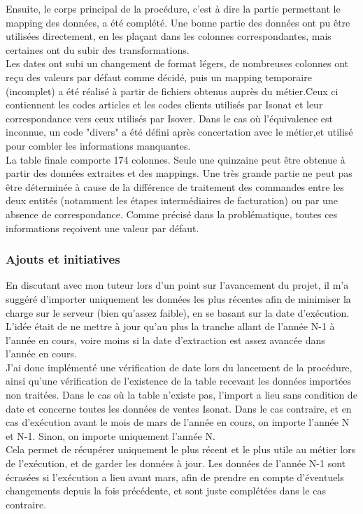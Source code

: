 \documentclass[a4paper,12pt]{article}
\begin{document}
Ensuite, le corps principal de la procédure, c'est à dire la partie permettant le mapping des données, a été complété. Une bonne partie des données ont pu être utilisées directement, en les plaçant dans les colonnes correspondantes, mais certaines ont du subir des transformations.\\
Les dates ont subi un changement de format légers, de nombreuses colonnes ont reçu des valeurs par défaut comme décidé, puis un mapping temporaire (incomplet) a été réalisé à partir de fichiers obtenus auprès du métier.Ceux ci contiennent les codes articles et les codes clients utilisés par Isonat et leur correspondance vers ceux utilisés par Isover. Dans le cas où l'équivalence est inconnue, un code "divers" a été défini après concertation avec le métier,et utilisé pour combler les informations manquantes. \\
La table finale comporte 174 colonnes. Seule une quinzaine peut être obtenue à partir des données extraites et des mappings. Une très grande partie ne peut pas être déterminée à cause de la différence de traitement des commandes entre les deux entités (notamment les étapes intermédiaires de facturation) ou par une absence de correspondance. Comme précisé dans la problématique, toutes ces informations reçoivent une valeur par défaut.


\subsubsection{Ajouts et initiatives}
En discutant avec mon tuteur lors d'un point sur l'avancement du projet, il m'a suggéré d'importer uniquement les données les plus récentes afin de minimiser la charge sur le serveur (bien qu'assez faible), en se basant sur la date d'exécution. L'idée était de ne mettre à jour qu'au plus la tranche allant de l'année N-1 à l'année en cours, voire moins si la date d'extraction est assez avancée dans l'année en cours. \\

J'ai donc implémenté une vérification de date lors du lancement de la procédure, ainsi qu'une vérification de l'existence de la table recevant les données importées non traitées. Dans le cas où la table n'existe pas, l'import a lieu sans condition de date et concerne toutes les données de ventes Isonat. Dans le cas contraire, et en cas d'exécution avant le mois de mars de l'année en cours, on importe l'année N et N-1. Sinon, on importe uniquement l'année N.\\
Cela permet de récupérer uniquement le plus récent et le plus utile au métier lors de l'exécution, et de garder les données à jour. Les données de l'année N-1 sont écrasées si l'exécution a lieu avant mars, afin de prendre en compte d'éventuels changements depuis la fois précédente, et sont juste complétées dans le cas contraire.\\
\end{document}
